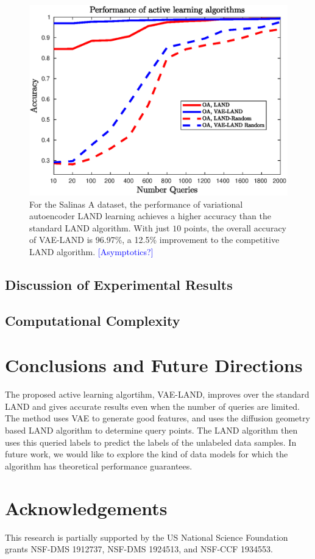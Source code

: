 \documentclass{article}
\newcommand{\JMM}[1]{{\textcolor{blue}{[#1]}}}
\begin{document}
\begin{figure}
    \includegraphics[width=.45\textwidth]{Images/salinasa_results_improved.eps}
    \caption{For the Salinas A dataset, the performance of variational autoencoder LAND learning achieves a higher accuracy than the standard LAND algorithm. With just $10$ points, the overall accuracy of VAE-LAND is 96.97\%, a 12.5\% improvement to the competitive LAND algorithm.  \JMM{Asymptotics?}}
    \label{fig:my_label}
\end{figure}

\subsection{Discussion of Experimental Results}



\subsection{Computational Complexity}



\section{Conclusions and Future Directions}
\label{sec:Conclusions}
The proposed active learning algortihm, VAE-LAND, improves over the standard LAND and gives accurate results even when the number of queries are limited. The method uses VAE to generate good features, and uses the diffusion geometry based LAND algorithm to determine query points. The LAND algorithm then uses this queried labels to predict the labels of the unlabeled data samples. In future work, we would like to explore the kind of data models for which the algorithm has theoretical performance guarantees.   
\section*{Acknowledgements}

This research is partially supported by the US National Science Foundation grants NSF-DMS 1912737, NSF-DMS 1924513, and NSF-CCF 1934553.






\end{document}
